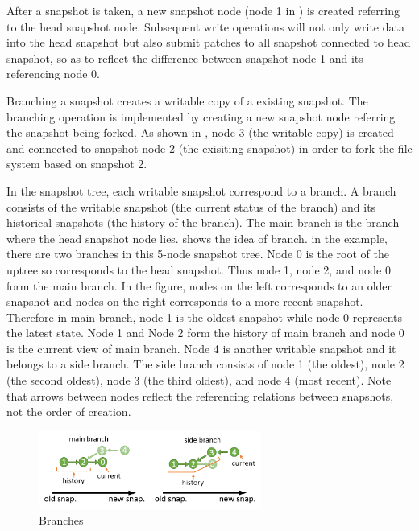     After a snapshot is taken, a new snapshot node (node 1 in ) is created referring to the head snapshot node. Subsequent write operations will not only write data into the head snapshot but also submit patches to all snapshot connected to head snapshot, so as to reflect the difference between snapshot node 1 and its referencing node 0.

    Branching a snapshot creates a writable copy of a existing snapshot. The branching operation is implemented by creating a new snapshot node referring the snapshot being forked. As shown in , node 3 (the writable copy) is created and connected to snapshot node 2 (the exisiting snapshot) in order to fork the file system based on snapshot 2.

    In the snapshot tree, each writable snapshot correspond to a branch. A branch consists of the writable snapshot (the current status of the branch) and its historical snapshots (the history of the branch). The main branch is the branch where the head snapshot node lies.  shows the idea of branch. in the example, there are two branches in this 5-node snapshot tree. Node 0 is the root of the uptree so corresponds to the head snapshot. Thus node 1, node 2, and node 0 form the main branch. In the figure, nodes on the left corresponds to an older snapshot and nodes on the right corresponds to a more recent snapshot. Therefore in main branch, node 1 is the oldest snapshot while node 0 represents the latest state. Node 1 and Node 2 form the history of main branch and node 0 is the current view of main branch. Node 4 is another writable snapshot and it belongs to a side branch. The side branch consists of node 1 (the oldest), node 2 (the second oldest), node 3 (the third oldest), and node 4 (most recent). Note that arrows between nodes reflect the referencing relations between snapshots, not the order of creation.

\begin{figure}[t]
\centering
\includegraphics[width=0.65\textwidth]{Chapter-4/figs/fig22.png}
\caption{Branches}
\label{fig:branches}
\end{figure}

